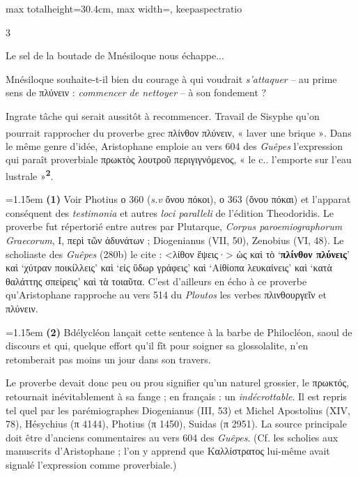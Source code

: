 \documentclass[11pt,twoside]{book}
\newcommand{\italique}[1]{\textit{#1}}
\newcommand{\latin}[1]{\textit{#1}}
\newcommand{\marqueur}[1]{\textsuperscript{\color{rubricRed}\textbf{#1}}}
\begin{document}
\begin{adjustbox}{max totalheight=30.4cm, max width=\textwidth, keepaspectratio}
\begin{minipage}{\textwidth}
{\begin{multicols}{3}
\par\vspace{1.5pt}
\noindent Le sel de la boutade de Mnésiloque nous échappe...
\par\vspace{1.5pt}
\noindent Mnésiloque souhaite-t-il bien du courage à qui voudrait \italique{s'attaquer} -- au prime sens de πλύνειν : \italique{commencer de nettoyer} -- à son fondement ?
\par\vspace{1.5pt}
\noindent Ingrate tâche qui serait aussitôt à recommencer. Travail de Sisyphe qu'on pourrait rapprocher du proverbe grec πλίνθον πλύνειν, « laver une brique »\marqueur{}. Dans le même genre d'idée, Aristophane emploie au vers 604 des \italique{Guêpes} l'expression qui paraît proverbiale πρωκτὸς λουτροῦ περιγιγνόμενος, « le c.. l'emporte sur l'eau lustrale »\marqueur{2}.
\par\vspace{1.5pt}
\par\vspace{1.2pt}\par\nopagebreak\vspace{1pt}\noindent\hangindent=1.15em {\color{sepiaNote}\textbf{(1)}} Voir Photius ο 360 (\italique{s.v} ὄνου πόκοι), ο 363 (ὄνου πόκαι) et l'apparat conséquent des \latin{testimonia} et autres \latin{loci paralleli} de l'édition Theodoridis. Le proverbe fut répertorié entre autres par Plutarque, \italique{Corpus paroemiographorum Graecorum}, I, περὶ τῶν ἀδυνάτων ; Diogenianus (VII, 50), Zenobius (VI, 48). Le scholiaste des \italique{Guêpes} (280b) le cite : <λίθον ἕψεις·> ὡς καὶ τὸ `\textbf{πλίνθον πλύνεις}' καὶ `χύτραν ποικίλλεις' καὶ `εἰς ὕδωρ γράφεις' καὶ `Αἰθίοπα λευκαίνεις' καὶ `κατὰ θαλάττης σπείρεις' καὶ τὰ τοιαῦτα. C'est d'ailleurs en écho à ce proverbe qu'Aristophane rapproche au vers 514 du \italique{Ploutos} les verbes πλινθουργεῖν et πλύνειν.
\par\vspace{1.5pt}
\noindent\hangindent=1.15em {\color{sepiaNote}\textbf{(2)}} Bdélycléon lançait cette sentence à la barbe de Philocléon, saoul de discours et qui, quelque effort qu'il fît pour soigner sa glossolalite, n'en retomberait pas moins un jour dans son travers.
\par\vspace{1.5pt}
\noindent Le proverbe devait donc peu ou prou signifier qu'un naturel grossier, le πρωκτός, retournait inévitablement à sa fange ; en français : un \italique{indécrottable}. Il est repris tel quel par les parémiographes Diogenianus (III, 53) et Michel Apostolius (XIV, 78), Hésychius (π 4144), Photius (π 1450), Suidas (π 2951). La source principale doit être d'anciens commentaires au vers 604 des \italique{Guêpes}. (Cf. les scholies aux manuscrits d'Aristophane ; l'on y apprend que Καλλίστρατος lui-même avait signalé l'expression comme proverbiale.)

\end{multicols}}
\end{minipage}
\end{adjustbox}
\end{document}
